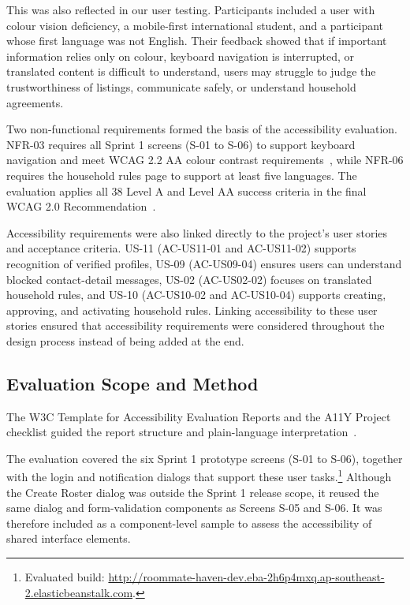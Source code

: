 \documentclass[11pt,a4paper]{article}
\begin{document}
This was also reflected in our user testing. Participants included a user with
colour vision deficiency, a mobile-first international student, and a participant
whose first language was not English. Their feedback showed that if important
information relies only on colour, keyboard navigation is interrupted, or
translated content is difficult to understand, users may struggle to judge the
trustworthiness of listings, communicate safely, or understand household
agreements.

Two non-functional requirements formed the basis of the accessibility evaluation.
NFR-03 requires all Sprint 1 screens (S-01 to S-06) to support keyboard
navigation and meet WCAG 2.2 AA colour contrast requirements~\cite{wcag22}, while NFR-06
requires the household rules page to support at least five languages. The
evaluation applies all 38 Level A and Level AA success criteria in the final
WCAG 2.0 Recommendation~\cite{wcag20}.

Accessibility requirements were also linked directly to the project's user
stories and acceptance criteria. US-11 (AC-US11-01 and AC-US11-02) supports
recognition of verified profiles, US-09 (AC-US09-04) ensures users can
understand blocked contact-detail messages, US-02 (AC-US02-02) focuses on
translated household rules, and US-10 (AC-US10-02 and AC-US10-04) supports
creating, approving, and activating household rules. Linking accessibility to
these user stories ensured that accessibility requirements were considered
throughout the design process instead of being added at the end.

\subsection{Evaluation Scope and Method}
\label{subseca11ymethod}

The W3C Template for Accessibility Evaluation Reports and the A11Y Project
checklist guided the report structure and plain-language
interpretation~\cite{w3cevaltemplate,a11ychecklist}.

The evaluation covered the six Sprint 1 prototype screens (S-01 to S-06),
together with the login and notification dialogs that support these user
tasks.\footnote{Evaluated build:
\url{http://roommate-haven-dev.eba-2h6p4mxq.ap-southeast-2.elasticbeanstalk.com}.}
Although the Create Roster dialog was outside the Sprint 1 release scope, it
reused the same dialog and form-validation components as Screens S-05 and
S-06. It was therefore included as a component-level sample to assess the
accessibility of shared interface elements.
\end{document}
